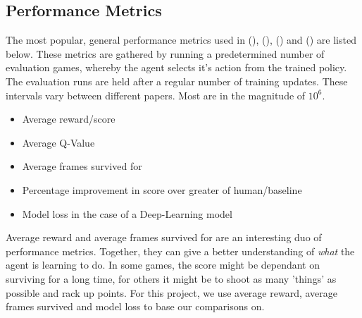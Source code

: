 \subsection{Performance Metrics}
The most popular, general performance metrics used in (\cite{deepmind1}), (\cite{doubleq}), (\cite{dueling}) and (\cite{human}) are listed below. These metrics are gathered by running a predetermined number of evaluation games, whereby the agent selects it's action from the trained policy. The evaluation runs are held after a regular number of training updates. These intervals vary between different papers. Most are in the magnitude of $10^6$.

\begin{itemize}
    \item Average reward/score
    \item Average Q-Value
    \item Average frames survived for
    \item Percentage improvement in score over greater of human/baseline
    \item Model loss in the case of a Deep-Learning model
\end{itemize}

Average reward and average frames survived for are an interesting duo of performance metrics. Together, they can give a better understanding of \textit{what} the agent is learning to do. In some games, the score might be dependant on surviving for a long time, for others it might be to shoot as many 'things' as possible and rack up points. For this project, we use average reward, average frames survived and model loss to base our comparisons on.